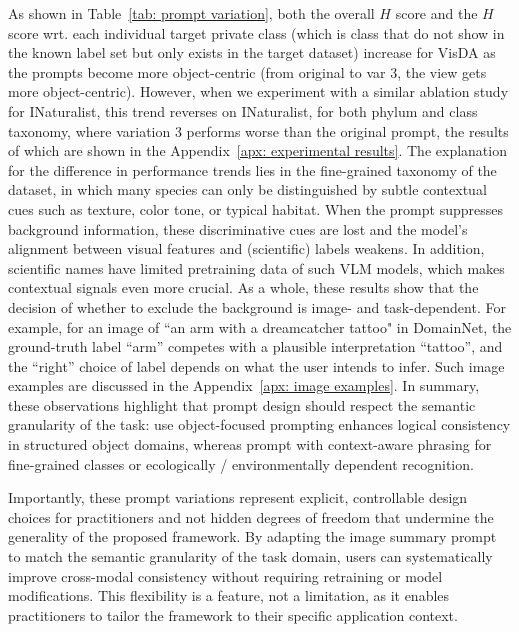 \documentclass[10pt]{article} %
\begin{document}
% 
As shown in Table~\ref{tab: prompt variation}, both the overall $H$ score and the $H$ score wrt. each individual target private class (which is class that do not show in the known label set but only exists in the target dataset) increase for VisDA as the prompts become more object-centric (from original to var 3, the view gets more object-centric).
However, when we experiment with a similar ablation study for INaturalist, this trend reverses on INaturalist, for both phylum and class taxonomy, where variation 3 performs worse than the original prompt, the results of which are shown in the Appendix~\ref{apx: experimental results}.
The explanation for the difference in performance trends lies in the fine-grained taxonomy of the dataset, in which many species can only be distinguished by subtle contextual cues such as texture, color tone, or typical habitat.
When the prompt suppresses background information, these discriminative cues are lost and the model’s alignment between visual features and (scientific) labels weakens.
In addition, scientific names have limited pretraining data of such VLM models, which makes contextual signals even more crucial.
As a whole, these results show that the decision of whether to exclude the background is image- and task-dependent.
For example, for an image of ``an arm with a dreamcatcher tattoo" in DomainNet, the ground-truth label ``arm'' competes with a plausible interpretation ``tattoo'', and the ``right'' choice of label depends on what the user intends to infer. Such image examples are discussed in the Appendix~\ref{apx: image examples}.
In summary, these observations highlight that prompt design should respect the semantic granularity of the task: use object-focused prompting enhances logical consistency in structured object domains, whereas prompt with context-aware phrasing for fine-grained classes or ecologically / environmentally dependent recognition.

Importantly, these prompt variations represent explicit, controllable design choices for practitioners and not hidden degrees of freedom that undermine the generality of the proposed framework. By adapting the image summary prompt to match the semantic granularity of the task domain, users can systematically improve cross-modal consistency without requiring retraining or model modifications. This flexibility is a feature, not a limitation, as it enables practitioners to tailor the framework to their specific application context.
\end{document}
